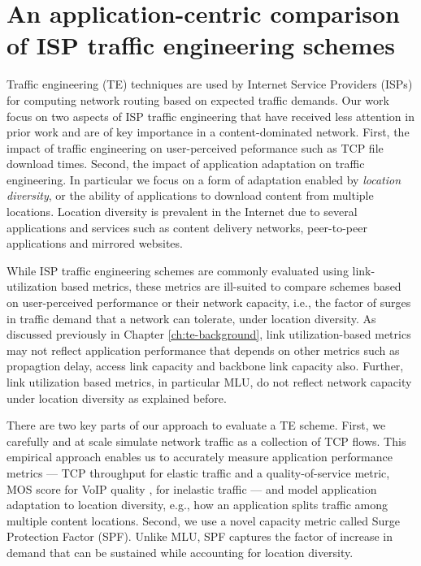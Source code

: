 \chapter{An application-centric comparison of ISP traffic engineering schemes}
\label{ch:beyondmlu}

Traffic engineering (TE) techniques are used by Internet Service Providers (ISPs) for computing network routing based on expected traffic demands. Our work focus on two aspects of ISP traffic engineering that have received less attention in prior work and are of key importance in a content-dominated network. First, the impact of traffic engineering on user-perceived peformance such as TCP file download times. Second, the impact of application adaptation on traffic engineering. In particular we focus on a form of adaptation enabled by \emph{location diversity}, or the ability of applications to download content from multiple locations. Location diversity is prevalent in the Internet due to several applications and services such as content delivery networks, peer-to-peer applications and mirrored websites.

While ISP traffic engineering schemes are commonly evaluated using link-utilization based metrics, these metrics are ill-suited to compare schemes based on user-perceived performance or their network capacity, i.e., the factor of surges in traffic demand that a network can tolerate, under location diversity. As discussed previously in Chapter \ref{ch:te-background}, link utilization-based metrics may not reflect application performance that depends on other metrics such as propagtion delay, access link capacity and backbone link capacity also. Further, link utilization based metrics, in particular MLU, do not reflect network capacity under location diversity as explained before. 

There are two key parts of our approach to evaluate a TE scheme. First, we carefully and at scale simulate network traffic as a collection of TCP flows. This empirical approach  enables us to accurately measure application performance metrics --- TCP throughput for elastic traffic and a quality-of-service metric,  MOS score for VoIP quality \cite{MOS-formula}, for inelastic traffic --- and model application adaptation to location diversity, e.g., how an application splits traffic among multiple content locations. Second, we use a novel capacity metric called Surge Protection Factor (SPF). Unlike MLU, SPF captures the factor of increase in demand that can be sustained while accounting for location diversity. 

